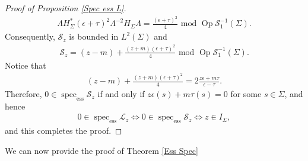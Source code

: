 \documentclass[11pt,a4paper,reqno,oneside]{amsproc}
\DeclareMathOperator{\spec}{spec}
\DeclareMathOperator{\Op}{Op}
\newcommand{\spece}{\spec_\mathrm{ess}}
\newcommand{\cS}{\mathcal{S}}
\numberwithin{equation}{section}
\begin{document}
\begin{proof}[Proof of Proposition \ref{Spec ess L}]
\begin{align*}
 \Lambda H_\Sigma^\ast(\epsilon+\tau)^2\Lambda^{-2} H_\Sigma \Lambda = \frac{(\epsilon+\tau)^2}{4} \,\, \mathrm{ mod }\,\,  \Op \cS^{-1}_1(\Sigma).
\end{align*}
Consequently,  $\mathcal S_z$ is bounded in $L^2(\Sigma)$ and 
\begin{align*}
\mathcal S_z= (z-m) +\frac{(z+m)(\epsilon+\tau)^2}{4}   \,\, \mathrm{ mod }\,\,  \Op \cS^{-1}_1(\Sigma).
\end{align*}
Notice that 
\begin{align*}
 (z-m) +\frac{(z+m)(\epsilon+\tau)^2}{4} = 2\frac{ z\epsilon +m\tau}{\epsilon-\tau}.
\end{align*}
Therefore, $0\in \spece \mathcal S_z$ if and only if $z\epsilon(s) +m\tau(s)=0$ for some $s\in\Sigma$, and hence 
\begin{align*}
			0\in \spece \mathcal L_z \Leftrightarrow  0\in \spece \mathcal S_z \Leftrightarrow z\in I_\Sigma,
\end{align*}
and this completes the proof.
\end{proof}

We can now provide the  proof of Theorem \ref{Ess Spec} 
\end{document}
